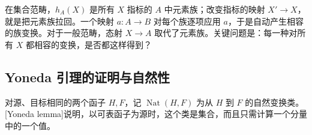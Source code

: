 \ProseParagraphBreak
在集合范畴，\(h_A(X)\) 是所有 \(X\) 指标的 \(A\) 中元素族；改变指标的映射 \(X'\rightarrow X\)，就是把元素族拉回。一个映射 \(a:A\rightarrow B\) 对每个族逐项应用 \(a\)，于是自动产生相容的族变换。对于一般范畴，态射 \(X\rightarrow A\) 取代了元素族。关键问题是：每一种对所有 \(X\) 都相容的变换，是否都这样得到？

\subsection{Yoneda 引理的证明与自然性}
\label{b4:subsec:0302:02}

对源、目标相同的两个函子 \(H,F\)，记 \(\operatorname{Nat}(H,F)\) 为从 \(H\) 到 \(F\) 的自然变换类。[Yoneda lemma]说明，以可表函子为源时，这个类是集合，而且只需计算一个分量中的一个值。

